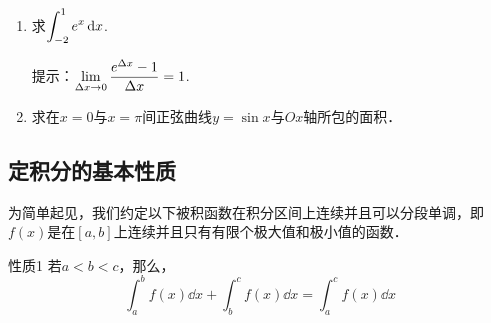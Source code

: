 \begin{ex}
\begin{enumerate}
    \item 求$\displaystyle\int^1_{-2}e^x\,{\rm d} x$. 

提示：$\displaystyle\lim_{\Delta x\to 0}\dfrac{e^{\Delta x}-1}{\Delta x}=1$.    

\item 求在$x=0$与$x=\pi$间正弦曲线$y=\sin x$与$Ox$轴所包的面积．
\end{enumerate}
\end{ex}    

\subsection{定积分的基本性质}

为简单起见，我们约定以下被积函数在积分区间上连续并且可以分段单调，即$f(x)$是在$[a,b]$上连续并且只有有限个极大值和极小值的函数．

\begin{blk}{性质1}
若$a<b<c$，那么，
\[\int^b_a f(x)\dd x+\int^c_b f(x)\dd x=\int^c_a f(x)\dd x\]
\end{blk}

